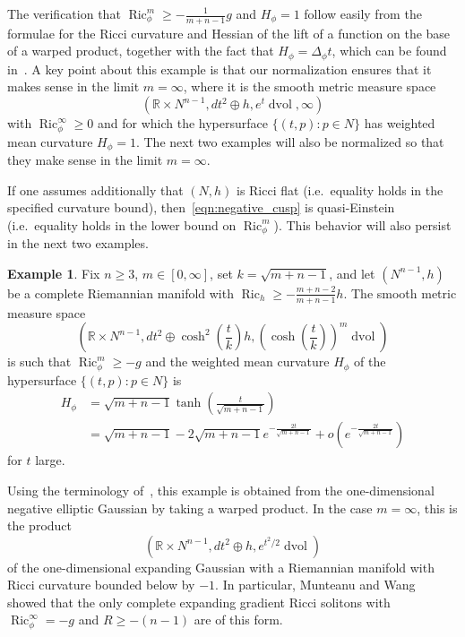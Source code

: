 \documentclass{amsart}
\theoremstyle{definition}
\newtheorem{example}[thm]{Example}
\theoremstyle{remark}
\numberwithin{equation}{section}
\begin{document}
The verification that $\operatorname{Ric}_\phi^m\geq-\frac{1}{m+n-1}g$ and $H_\phi=1$ follow easily from the formulae for the Ricci curvature and Hessian of the lift of a function on the base of a warped product, together with the fact that $H_\phi=\Delta_\phi t$, which can be found in~\cite[Chapter~9]{Besse}.  A key point about this example is that our normalization ensures that it makes sense in the limit $m=\infty$, where it is the smooth metric measure space
\[ \left({\mathbb{R}}\times N^{n-1}, dt^2\oplus h, e^t\operatorname{dvol}, \infty\right) \]
with $\operatorname{Ric}_\phi^\infty\geq0$ and for which the hypersurface $\{(t,p)\colon p\in N\}$ has weighted mean curvature $H_\phi=1$.  The next two examples will also be normalized so that they make sense in the limit $m=\infty$.

If one assumes additionally that $(N,h)$ is Ricci flat (i.e.\ equality holds in the specified curvature bound), then~\eqref{eqn:negative_cusp} is quasi-Einstein (i.e.\ equality holds in the lower bound on $\operatorname{Ric}_\phi^m$).  This behavior will also persist in the next two examples.

\begin{example}
\label{ex:negative_elliptic_gaussian_warped_cylinder}
Fix $n\geq 3$, $m\in[0,\infty]$, set $k=\sqrt{m+n-1}$, and let $(N^{n-1},h)$ be a complete Riemannian manifold with $\operatorname{Ric}_h\geq-\frac{m+n-2}{m+n-1}h$.  The smooth metric measure space
\begin{equation}
\label{eqn:negative_elliptic_gaussian_warped_cylinder}
\left( {\mathbb{R}}\times N^{n-1}, dt^2\oplus\cosh^2\left(\frac{t}{k}\right)h, \left(\cosh\left(\frac{t}{k}\right)\right)^m\operatorname{dvol} \right)
\end{equation}
is such that $\operatorname{Ric}_\phi^m\geq-g$ and the weighted mean curvature $H_\phi$ of the hypersurface $\{(t,p)\colon p\in N\}$ is
\begin{equation}
\label{eqn:negative_elliptic_gaussian_warped_cylinder_mean_curvature}
\begin{split}
H_\phi & = \sqrt{m+n-1}\tanh\left(\frac{t}{\sqrt{m+n-1}}\right) \\
& = \sqrt{m+n-1} - 2\sqrt{m+n-1}e^{-\frac{2t}{\sqrt{m+n-1}}} + o\left(e^{-\frac{2t}{\sqrt{m+n-1}}}\right)
\end{split}
\end{equation}
for $t$ large.
\end{example}

Using the terminology of~\cite{Case2010a,HePetersenWylie2010}, this example is obtained from the one-dimensional negative elliptic Gaussian by taking a warped product.  In the case $m=\infty$, this is the product
\[ \left({\mathbb{R}}\times N^{n-1}, dt^2\oplus h, e^{t^2/2}\operatorname{dvol} \right) \]
of the one-dimensional expanding Gaussian with a Riemannian manifold with Ricci curvature bounded below by $-1$.  In particular, Munteanu and Wang~\cite{MunteanuWang2011b} showed that the only complete expanding gradient Ricci solitons with $\operatorname{Ric}_\phi^\infty=-g$ and $R\geq-(n-1)$ are of this form.
\end{document}
